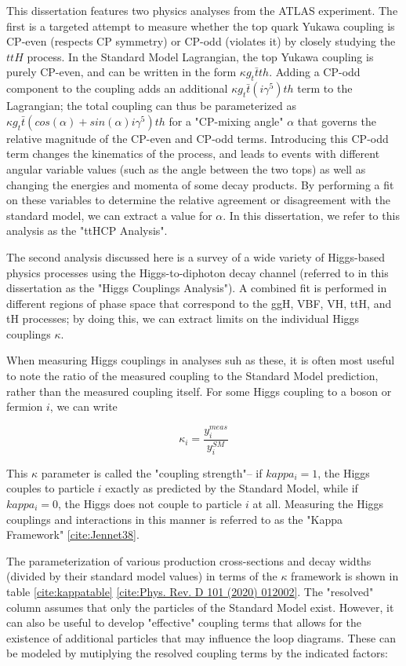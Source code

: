 This dissertation features two physics analyses from the ATLAS experiment. The first is a targeted attempt to measure whether the top quark Yukawa coupling is CP-even (respects CP symmetry) or CP-odd (violates it) by closely studying the $ttH$ process. In the Standard Model Lagrangian, the top Yukawa coupling is purely CP-even, and can be written in the form $\kappa g_{t} \bar{t}th$. Adding a CP-odd component to the coupling adds an additional $\kappa g_{t} \bar{t} (i \gamma^{5})th$ term to the Lagrangian; the total coupling can thus be parameterized as $\kappa g_{t} \bar{t} (cos(\alpha)+ sin(\alpha) i \gamma^{5} )th$ for a "CP-mixing angle" $\alpha$ that governs the relative magnitude of the CP-even and CP-odd terms. Introducing this CP-odd term changes the kinematics of the process, and leads to events with different angular variable values (such as the angle between the two tops) as well as changing the energies and momenta of some decay products. By performing a fit on these variables to determine the relative agreement or disagreement with the standard model, we can extract a value for $\alpha$. In this dissertation, we refer to this analysis as the "ttHCP Analysis".

The second analysis discussed here is a survey of a wide variety of Higgs-based physics processes using the Higgs-to-diphoton decay channel (referred to in this dissertation as the "Higgs Couplings Analysis"). A combined fit is performed in different regions of phase space that correspond to the ggH, VBF, VH, ttH, and tH processes; by doing this, we can extract limits on the individual Higgs couplings $\kappa$.

When measuring Higgs couplings in analyses suh as these, it is often most useful to note the ratio of the measured coupling to the Standard Model prediction, rather than the measured coupling itself. For some Higgs coupling to a boson or fermion $i$, we can write

\begin{equation}
\kappa_{i} = \frac{y_{i}^{meas}}{y_{i}^{SM}}
\end{equation}

This $\kappa$ parameter is called the "coupling strength"-- if $kappa_{i} = 1$, the Higgs couples to particle $i$ exactly as predicted by the Standard Model, while if $kappa_{i} = 0$, the Higgs does not couple to particle $i$ at all. Measuring the Higgs couplings and interactions in this manner is referred to as the "Kappa Framework" \ref{cite:Jennet38}.

The parameterization of various production cross-sections and decay widths (divided by their standard model values) in terms of the $\kappa$ framework is shown in table \ref{cite:kappatable} \ref{cite:Phys. Rev. D 101 (2020) 012002}. The "resolved" column assumes that only the particles of the Standard Model exist. However, it can also be useful to develop "effective" coupling terms that allows for the existence of additional particles that may influence the loop diagrams. These can be modeled by mutiplying the resolved coupling terms by the indicated factors:

